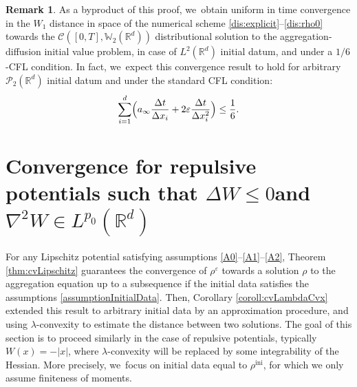 \documentclass[JEP,XML,SOM,Unicode, NoFloatCountersInSection,published]{cedram}
\newcommand{\ini}{\mathrm{ini}}
\def\RR{\mathbb{R}}
\def\WW{\mathbb{W}}
\def\eps{\varepsilon}
\def\dt{\Delta t}
\def\dx{\Delta x}
\def\calC{{\mathcal C}}
\def\calP{{\mathcal P}}
\theoremstyle{plain}
\theoremstyle{definition}
\newtheorem{remark}[theorem]{Remark}
\begin{document}
\begin{remark}
As a byproduct of this proof, we~obtain uniform in time convergence in the $W_1$ distance in space of the numerical scheme \eqref{dis:explicit}--\eqref{dis:rho0} towards the $\calC([0,T], \WW_2(\RR^d))$ distributional solution to the aggregation-diffusion initial value problem, in case of $L^2(\RR^d)$ initial datum, and under a $1/6$-CFL condition. In fact, we~expect this convergence result to hold for arbitrary $\calP_2(\RR^d)$ initial datum and under the standard CFL condition:
\[
\sum_{i=1}^d \Bigl(a_\infty \frac{\dt}{\dx_i} + 2\eps \frac{\dt}{\dx_i^2}\Bigr) \leq \frac 16.
\]
\end{remark}

\section{Convergence for repulsive potentials such that
\texorpdfstring{$\Delta W \leq 0$\nobreakspace and\nobreakspace $\nabla^2 W \in L^{p_0}(\RR^d)$}{titlesection2}}\label{section:repulsive}

For any Lipschitz potential satisfying assumptions \eqref{A0}--\eqref{A1}--\eqref{A2}, Theorem \ref{thm:cvLipschitz} guarantees the convergence of $\rho^\eps$ towards a solution $\rho$ to the aggregation equation up to a subsequence if the initial data satisfies the assumptions \eqref{assumptionInitialData}. Then, Corollary \ref{coroll:cvLambdaCvx} extended this result to arbitrary initial data by an approximation procedure, and using $\lambda$-convexity to estimate the distance between two solutions. The goal of this section is to proceed similarly in the case of repulsive potentials, typically $W(x) = -|x|$, where $\lambda$-convexity will be replaced by some integrability of the Hessian. More precisely, we~focus on initial data equal to $\rho^{\ini}$, for which we only assume finiteness of moments.
\end{document}

